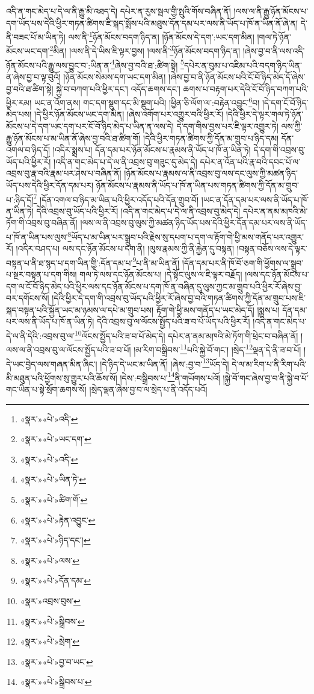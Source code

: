 འདི་ན་གང་མེད་པ་དེ་ལ་ནི་རྒྱུ་མི་འཐད་དེ། དཔེར་ན་རུས་སྦལ་གྱི་སྤུའི་གོས་བཞིན་ནོ། །ལས་ལ་ནི་རྒྱུ་ཉོན་མོངས་པ་དག་ཡོད་པས་དེའི་ཕྱིར་གཏན་ཚིགས་ཇི་སྐད་སྨོས་པའི་མཐུས་དོན་དམ་པར་ལས་ནི་ཡོད་པ་ཁོ་ན་ཡིན་ནོ་ཞེ་ན། དེ་ནི་བཟང་པོ་མ་ཡིན་ཏེ། ལས་ནི་\footnote{«སྣར་»«པེ་»འདི་}ཉོན་མོངས་བདག་ཉིད་ན། །ཉོན་མོངས་དེ་དག་:ཡང་དག་མིན། །གལ་ཏེ་ཉོན་མོངས་ཡང་དག་\footnote{«སྣར་»«པེ་»ཡང་དག་}མིན། །ལས་ནི་དེ་ཡིས་ཇི་ལྟར་བྱས། །ལས་ནི་\footnote{«སྣར་»«པེ་»འདི་}ཉོན་མོངས་བདག་ཉིད་ན། །ཞེས་བྱ་བ་ནི་ལས་འདི་ཉོན་མོངས་པའི་རྒྱུ་ལས་བྱུང་བ་:ཡིན་ན་\footnote{«སྣར་»«པེ་»ཡིན་ཏེ་}ཞེས་བྱ་བའི་ཐ་:ཚིག་སྟེ། \footnote{«སྣར་»«པེ་»ཚིག་གོ་}དཔེར་ན་བུམ་པ་འཇིམ་པའི་བདག་ཉིད་ཡིན་ན་ཞེས་བྱ་བ་ལྟ་བུའོ། །ཉོན་མོངས་སེམས་དག་ཡང་དག་མིན། །ཞེས་བྱ་བ་ནི་ཉོན་མོངས་པའི་ངོ་བོ་ཉིད་མེད་དོ་ཞེས་བྱ་བའི་ཐ་ཚིག་སྟེ། སྐྱེ་བ་བཀག་པའི་ཕྱིར་དང་། འདོད་ཆགས་དང་། ཆགས་པ་བརྟག་པར་དེའི་ངོ་བོ་ཉིད་བཀག་པའི་ཕྱིར་རམ། ཡང་ན་འོག་ནས། གང་དག་སྡུག་དང་མི་སྡུག་པའི། །ཕྱིན་ཅི་ལོག་ལ་:བརྟེན་འབྱུང་\footnote{«སྣར་»«པེ་»རྟེན་འབྱུང་}བ། །དེ་དག་ངོ་བོ་ཉིད་མེད་པས། །དེ་ཕྱིར་ཉོན་མོངས་ཡང་དག་མིན། །ཞེས་འགོག་པར་འགྱུར་བའི་ཕྱིར་རོ། །དེའི་ཕྱིར་དེ་ལྟར་གལ་ཏེ་ཉོན་མོངས་པ་དེ་དག་ཡང་དག་པར་ངོ་བོ་ཉིད་མེད་པ་ཡིན་ན་ལས་དེ། དེ་དག་གིས་བྱས་པར་ཇི་ལྟར་འགྱུར་ཏེ། ལས་ཀྱི་རྒྱུ་ཉོན་མོངས་པ་མ་ཡིན་ནོ་ཞེས་བྱ་བའི་ཐ་ཚིག་གོ། །དེའི་ཕྱིར་གཏན་ཚིགས་ཀྱི་དོན་མ་གྲུབ་པ་ཉིད་དམ། དོན་འགལ་བ་ཉིད་དོ། །འདིར་སྨྲས་པ། དོན་དམ་པར་ཉོན་མོངས་པ་རྣམས་ནི་ཡོད་པ་ཁོ་ན་ཡིན་ཏེ། དེ་དག་གི་འབྲས་བུ་ཡོད་པའི་ཕྱིར་རོ། །འདི་ན་གང་མེད་པ་དེ་ལ་ནི་འབྲས་བུ་གཟུང་དུ་མེད་དེ། དཔེར་ན་འོན་པའི་རྣ་བའི་དབང་པོ་ལ་འབྲས་བུ་རྣ་བའི་རྣམ་པར་ཤེས་པ་བཞིན་ནོ། །ཉོན་མོངས་པ་རྣམས་ལ་ནི་འབྲས་བུ་ལས་དང་ལུས་ཀྱི་མཚན་ཉིད་ཡོད་པས་དེའི་ཕྱིར་དོན་དམ་པར། ཉོན་མོངས་པ་རྣམས་ནི་ཡོད་པ་ཁོ་ན་ཡིན་པས་གཏན་ཚིགས་ཀྱི་དོན་མ་གྲུབ་པ་:ཉིད་དོ།\footnote{«སྣར་»«པེ་»ཉིད་དང་།} །དོན་འགལ་བ་ཉིད་མ་ཡིན་པའི་ཕྱིར་འདོད་པའི་དོན་གྲུབ་བོ། །ཡང་ན་དོན་དམ་པར་ལས་ནི་ཡོད་པ་ཁོ་ན་ཡིན་ཏེ། དེའི་འབྲས་བུ་ཡོད་པའི་ཕྱིར་རོ། །འདི་ན་གང་མེད་པ་དེ་ལ་ནི་འབྲས་བུ་མེད་དེ། དཔེར་ན་ནམ་མཁའི་མེ་ཏོག་གི་འབྲས་བུ་བཞིན་ནོ། །ལས་ལ་ནི་འབྲས་བུ་ལུས་ཀྱི་མཚན་ཉིད་ཡོད་པས་དེའི་ཕྱིར་དོན་དམ་པར་ལས་ནི་ཡོད་པ་ཁོ་ན་ཡིན་པས་ལུས་\footnote{«སྣར་»«པེ་»ལས་}ཡོད་པ་མ་ཡིན་པར་སྒྲུབ་པའི་རྗེས་སུ་དཔག་པ་དག་ལ་རྟོག་གེ་ཕྱི་མས་གནོད་པར་འགྱུར་རོ། །འདིར་བཤད་པ། ལས་དང་ཉོན་མོངས་པ་དག་ནི། །ལུས་རྣམས་ཀྱི་ནི་རྐྱེན་དུ་བསྟན། །བསྟན་བཅོས་ལས་དེ་ལྟར་བསྟན་པ་ནི་ཐ་སྙད་པ་དག་ཡིན་གྱི་:དོན་དམ་པ་\footnote{«སྣར་»«པེ་»དོན་དམ་}པ་ནི་མ་ཡིན་ནོ། །དོན་དམ་པར་ནི་ཁོ་བོ་ཅག་གི་ཕྱོགས་ལ་སྒྲུབ་པ་སྔར་བསྟན་པ་དག་གིས། གལ་ཏེ་ལས་དང་ཉོན་མོངས་པ། །དེ་སྟོང་ལུས་ལ་ཇི་ལྟར་བརྗོད། །ལས་དང་ཉོན་མོངས་པ་དག་ལ་ངོ་བོ་ཉིད་མེད་པའི་ཕྱིར་ལས་དང་ཉོན་མོངས་པ་དག་ཁོ་ན་བཞིན་དུ་ལུས་ཀྱང་མ་གྲུབ་པའི་ཕྱིར་རོ་ཞེས་བྱ་བར་དགོངས་སོ། །དེའི་ཕྱིར་དེ་དག་གི་འབྲས་བུ་ཡོད་པའི་ཕྱིར་རོ་ཞེས་བྱ་བའི་གཏན་ཚིགས་ཀྱི་དོན་མ་གྲུབ་པས་ཇི་སྐད་བསྟན་པའི་སྐྱོན་ཡང་མ་ཉམས་ལ་དཔེ་མ་གྲུབ་པས། རྟོག་གེ་ཕྱི་མས་གནོད་པ་ཡང་མེད་དོ། །སྨྲས་པ། དོན་དམ་པར་ལས་ནི་ཡོད་པ་ཁོ་ན་ཡིན་ཏེ། དེའི་འབྲས་བུ་ལ་ལོངས་སྤྱོད་པའི་ཟ་བ་པོ་ཡོད་པའི་ཕྱིར་རོ། །འདི་ན་གང་མེད་པ་དེ་ལ་ནི་དེའི་:འབྲས་བུ་ལ་\footnote{«སྣར་»འབྲས་བུས་}ལོངས་སྤྱོད་པའི་ཟ་བ་པོ་མེད་དེ། དཔེར་ན་ནམ་མཁའི་མེ་ཏོག་གི་ཕྲེང་བ་བཞིན་ནོ། །ལས་ལ་ནི་འབྲས་བུ་ལ་ལོངས་སྤྱོད་པའི་ཟ་བ་པོ། །མ་རིག་བསྒྲིབས་\footnote{«སྣར་»«པེ་»སྒྲིབས་}པའི་སྐྱེ་བོ་གང་། །སྲེད་\footnote{«སྣར་»«པེ་»སྲེག་}ལྡན་དེ་ནི་ཟ་བ་པོ། །དེ་ཡང་བྱེད་ལས་གཞན་མིན་ཞིང་། །དེ་ཉིད་དེ་ཡང་མ་ཡིན་ནོ། །ཞེས་:བྱ་བ་\footnote{«སྣར་»«པེ་»བྱ་བ་ཡང་}ཡོད་དེ། དེ་ལ་མ་རིག་པ་ནི་རིག་པའི་མི་མཐུན་པའི་ཕྱོགས་སུ་གྱུར་པའི་ཆོས་སོ། །དེས་:བསྒྲིབས་པ་\footnote{«སྣར་»«པེ་»སྒྲིབས་པ་}ནི་གཡོགས་པའོ། །སྐྱེ་བོ་གང་ཞེས་བྱ་བ་ནི་སྐྱེ་བ་པོ་གང་ཡིན་པ་སྟེ་སྲོག་ཆགས་སོ། །སྲེད་ལྡན་ཞེས་བྱ་བ་ལ་སྲེད་པ་ནི་འདོད་པའོ། 